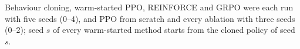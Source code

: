 Behaviour cloning, warm-started PPO, REINFORCE and GRPO were each run with five seeds (0--4), and PPO from scratch and every ablation with three seeds (0--2); seed $s$ of every warm-started method starts from the cloned policy of seed $s$.

